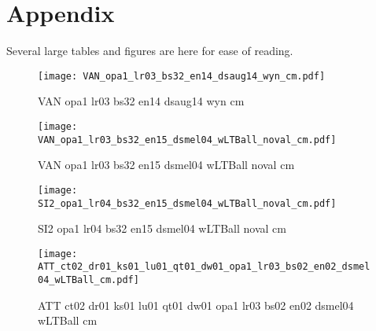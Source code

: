 \section{Appendix}
\label{sec:appendix}

\renewcommand{\thefigure}{A.\arabic{figure}}
\setcounter{figure}{0}

\renewcommand{\thetable}{A.\arabic{table}}
\setcounter{table}{0}

Several large tables and figures are here for ease of reading.

\begin{figure}[t!]
    \centering
    \texttt{[image: VAN\_opa1\_lr03\_bs32\_en14\_dsaug14\_wyn\_cm.pdf]}
    \caption{VAN opa1 lr03 bs32 en14 dsaug14 wyn cm}%
    \label{fig:VAN_opa1_lr03_bs32_en14_dsaug14_wyn_cm}
\end{figure}


\begin{figure*}[t!]
    \centering
    \texttt{[image: VAN\_opa1\_lr03\_bs32\_en15\_dsmel04\_wLTBall\_noval\_cm.pdf]}
    \caption{VAN opa1 lr03 bs32 en15 dsmel04 wLTBall noval cm}%
    \label{fig:VAN_opa1_lr03_bs32_en15_dsmel04_wLTBall_noval_cm}
\end{figure*}

\begin{figure*}[t!]
    \centering
    \texttt{[image: SI2\_opa1\_lr04\_bs32\_en15\_dsmel04\_wLTBall\_noval\_cm.pdf]}
    \caption{SI2 opa1 lr04 bs32 en15 dsmel04 wLTBall noval cm}%
    \label{fig:SI2_opa1_lr04_bs32_en15_dsmel04_wLTBall_noval_cm}
\end{figure*}

\begin{figure*}[t!]
    \centering
    \texttt{[image: ATT\_ct02\_dr01\_ks01\_lu01\_qt01\_dw01\_opa1\_lr03\_bs02\_en02\_dsmel04\_wLTBall\_cm.pdf]}
    \caption{ATT ct02 dr01 ks01 lu01 qt01 dw01 opa1 lr03 bs02 en02 dsmel04 wLTBall cm}%
    \label{fig:ATT_ct02_dr01_ks01_lu01_qt01_dw01_opa1_lr03_bs02_en02_dsmel04_wLTBall_cm}
\end{figure*}

